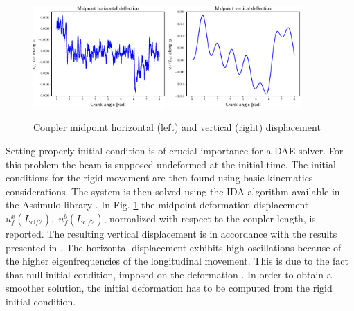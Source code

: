 \documentclass{svjour3}                     %
\begin{document}
\begin{figure}[tb]
	\centering
	\includegraphics[width=0.45\textwidth]{uM_disp.eps} 
	\includegraphics[width=0.45\textwidth]{wM_disp.eps} 
	\caption{Coupler midpoint horizontal (left) and vertical (right) displacement}
	\label{fig:defM_crsl}
\end{figure}

Setting properly initial condition is of crucial importance for a DAE solver. For this problem the beam is supposed undeformed at the initial time. The initial conditions for the rigid movement are then found using basic kinematics considerations.  The system is then solved using the IDA algorithm available in the Assimulo library \cite{assimulo}. In Fig. \ref{fig:defM_crsl} the midpoint deformation displacement $u_f^x(L_{\text{cl}/2}),\; u_f^y(L_{\text{cl}/2})$, normalized with respect to the coupler length, is reported. The resulting vertical displacement is in accordance with the results presented in \cite{Ellenbroek2018}. The horizontal displacement exhibits high oscillations because of the higher eigenfrequencies of the longitudinal movement. This is due to the fact that null initial condition, imposed on the deformation \cite{MB_Daepde}. In order to obtain a smoother solution, the initial deformation has to be computed from the rigid initial condition.
\end{document}
